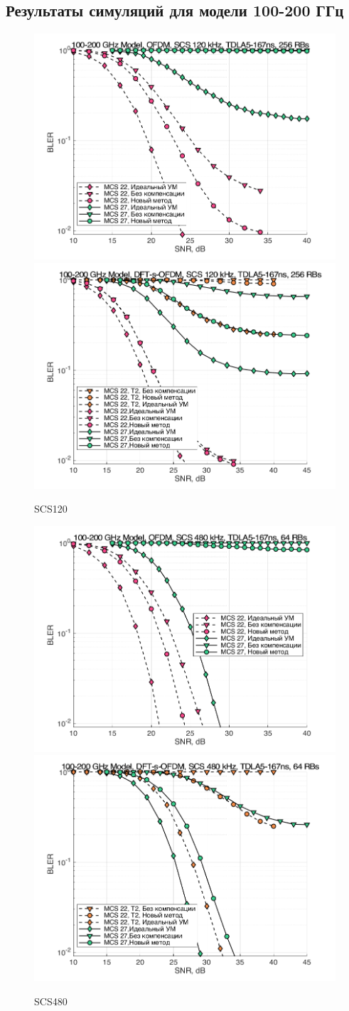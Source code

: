 \subsection{Результаты симуляций для модели 100-200 ГГц}

\begin{figure}[h!]
    \centering
    \includegraphics[width=0.49\linewidth]{figs/res/ofdm/OFDM_SubTHz_SCS120_MCS22_27.png}
    \includegraphics[width=0.49\linewidth]{figs/res/dftsofdm/DFT-s-OFDM_SubTHz_SCS120_MCS22_27.png}
    \caption{SCS120}
    \label{fig:res100200_scs120}
\end{figure}

\begin{figure}[h!]
    \centering
    \includegraphics[width=0.49\linewidth]{figs/res/ofdm/OFDM_SubTHz_SCS480_MCS22_27.png}
    \includegraphics[width=0.49\linewidth]{figs/res/dftsofdm/DFT-s-OFDM_SubTHz_SCS480_MCS22_27.png}
    \caption{SCS480}
    \label{fig:res100200_scs480}
\end{figure}

